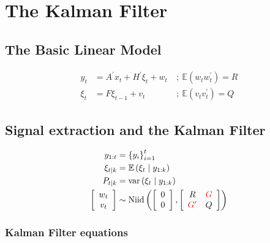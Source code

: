 \section{The Kalman Filter}

\subsection{The Basic Linear Model}

\begin{align*}
    y_t&=A^{\prime} x_t+H^{\prime} \xi_t+w_t \: &; \: 
    \mathbb{E}\left(w_t w_t^{\prime}\right)=R \\
    \xi_t&=F \xi_{t-1}+v_t \: &; \: 
    \mathbb{E}\left(v_t v_t^{\prime}\right)=Q
\end{align*}

\subsection{Signal extraction and the Kalman Filter}

\begin{align*}
    y_{1: t}&=\left\{y_i\right\}_{i=1}^t \\
    \xi_{t \mid k}&=\mathbb{E}\left(\xi_t \mid y_{1: k}\right) \\
    P_{t \mid k}&=\operatorname{var}\left(\xi_t \mid y_{1: k}\right) \\
    \left[\begin{array}{c}
    w_t \\
    v_t
    \end{array}\right] &\sim \operatorname{Niid}\left(\left[\begin{array}{l}
    0 \\
    0
    \end{array}\right],\left[\begin{array}{cc}
    R & \color{red}G\color{black} \\
    \color{red}G^\prime\color{black} & Q
    \end{array}\right]\right)       
\end{align*}

\subsubsection{Kalman Filter equations}

